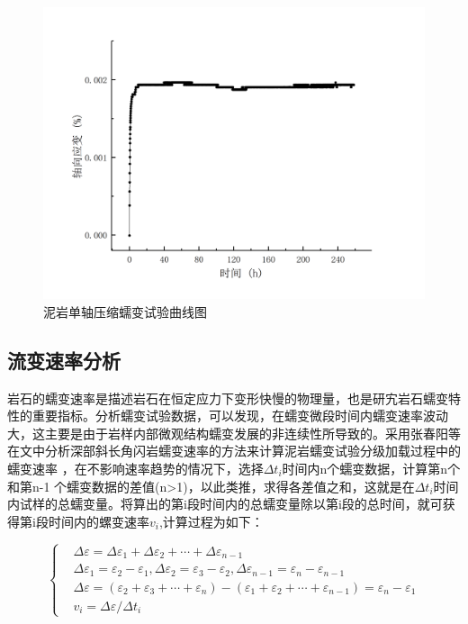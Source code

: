 \begin{figure}[ht!]
{\begin{minipage}{7cm}
            \includegraphics[width=1.1\textwidth]{img/chap2/C-05.png}
        \end{minipage}
    }
    \centering
    \caption{泥岩单轴压缩蠕变试验曲线图}
    \label{fig:2-9}
\end{figure}

\subsection{流变速率分析}
岩石的蠕变速率是描述岩石在恒定应力下变形快慢的物理量，也是研宄岩石蠕变特性的重要指标。分析蠕变试验数据，可以发现，在蠕变微段时间内蠕变速率波动大，这主要是由于岩样内部微观结构蠕变发展的非连续性所导致的。采用张春阳等\cite{张春阳}在文中分析深部斜长角闪岩蠕变速率的方法来计算泥岩蠕变试验分级加载过程中的蠕变速率
，在不影响速率趋势的情况下，选择$\Delta{t_i}$时间内n个蠕变数据，计算第n个和第n-1
个蠕变数据的差值(n>1)，以此类推，求得各差值之和，这就是在$\Delta{t_i}$时间内试样的总蠕变量。将算出的第i段时间内的总蠕变量除以第i段的总时间，就可获得第i段时间内的螺变速率$v_i$,计算过程为如下：

\begin{equation}
  \left\{
  \begin{aligned}
 &\Delta{\varepsilon} =\Delta{\varepsilon_1}+\Delta{\varepsilon_2}+\cdots+\Delta{\varepsilon_{n-1}}  \\
 & \Delta{\varepsilon_1}=\varepsilon_2-\varepsilon_1,\Delta{\varepsilon_2}=\varepsilon_3-\varepsilon_2,\Delta{\varepsilon_{n-1}}=\varepsilon_n-\varepsilon_{n-1}\\ 
 & \Delta{\varepsilon}=(\varepsilon_2+\varepsilon_3+\cdots+\varepsilon_n)-(\varepsilon_1+\varepsilon_2+\cdots+\varepsilon_{n-1})=\varepsilon_n-\varepsilon_1  \\
 & {v_i}=\Delta{\varepsilon}/\Delta{t_i}
 \end{aligned}
 \right.
\end{equation}


